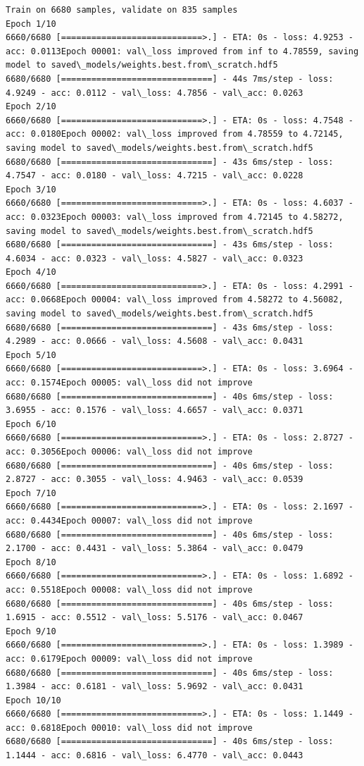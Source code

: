 \documentclass[11pt]{article}
\begin{document}
    \begin{Verbatim}[commandchars=\\\{\}]
Train on 6680 samples, validate on 835 samples
Epoch 1/10
6660/6680 [============================>.] - ETA: 0s - loss: 4.9253 - acc: 0.0113Epoch 00001: val\_loss improved from inf to 4.78559, saving model to saved\_models/weights.best.from\_scratch.hdf5
6680/6680 [==============================] - 44s 7ms/step - loss: 4.9249 - acc: 0.0112 - val\_loss: 4.7856 - val\_acc: 0.0263
Epoch 2/10
6660/6680 [============================>.] - ETA: 0s - loss: 4.7548 - acc: 0.0180Epoch 00002: val\_loss improved from 4.78559 to 4.72145, saving model to saved\_models/weights.best.from\_scratch.hdf5
6680/6680 [==============================] - 43s 6ms/step - loss: 4.7547 - acc: 0.0180 - val\_loss: 4.7215 - val\_acc: 0.0228
Epoch 3/10
6660/6680 [============================>.] - ETA: 0s - loss: 4.6037 - acc: 0.0323Epoch 00003: val\_loss improved from 4.72145 to 4.58272, saving model to saved\_models/weights.best.from\_scratch.hdf5
6680/6680 [==============================] - 43s 6ms/step - loss: 4.6034 - acc: 0.0323 - val\_loss: 4.5827 - val\_acc: 0.0323
Epoch 4/10
6660/6680 [============================>.] - ETA: 0s - loss: 4.2991 - acc: 0.0668Epoch 00004: val\_loss improved from 4.58272 to 4.56082, saving model to saved\_models/weights.best.from\_scratch.hdf5
6680/6680 [==============================] - 43s 6ms/step - loss: 4.2989 - acc: 0.0666 - val\_loss: 4.5608 - val\_acc: 0.0431
Epoch 5/10
6660/6680 [============================>.] - ETA: 0s - loss: 3.6964 - acc: 0.1574Epoch 00005: val\_loss did not improve
6680/6680 [==============================] - 40s 6ms/step - loss: 3.6955 - acc: 0.1576 - val\_loss: 4.6657 - val\_acc: 0.0371
Epoch 6/10
6660/6680 [============================>.] - ETA: 0s - loss: 2.8727 - acc: 0.3056Epoch 00006: val\_loss did not improve
6680/6680 [==============================] - 40s 6ms/step - loss: 2.8727 - acc: 0.3055 - val\_loss: 4.9463 - val\_acc: 0.0539
Epoch 7/10
6660/6680 [============================>.] - ETA: 0s - loss: 2.1697 - acc: 0.4434Epoch 00007: val\_loss did not improve
6680/6680 [==============================] - 40s 6ms/step - loss: 2.1700 - acc: 0.4431 - val\_loss: 5.3864 - val\_acc: 0.0479
Epoch 8/10
6660/6680 [============================>.] - ETA: 0s - loss: 1.6892 - acc: 0.5518Epoch 00008: val\_loss did not improve
6680/6680 [==============================] - 40s 6ms/step - loss: 1.6915 - acc: 0.5512 - val\_loss: 5.5176 - val\_acc: 0.0467
Epoch 9/10
6660/6680 [============================>.] - ETA: 0s - loss: 1.3989 - acc: 0.6179Epoch 00009: val\_loss did not improve
6680/6680 [==============================] - 40s 6ms/step - loss: 1.3984 - acc: 0.6181 - val\_loss: 5.9692 - val\_acc: 0.0431
Epoch 10/10
6660/6680 [============================>.] - ETA: 0s - loss: 1.1449 - acc: 0.6818Epoch 00010: val\_loss did not improve
6680/6680 [==============================] - 40s 6ms/step - loss: 1.1444 - acc: 0.6816 - val\_loss: 6.4770 - val\_acc: 0.0443

    \end{Verbatim}
\end{document}
